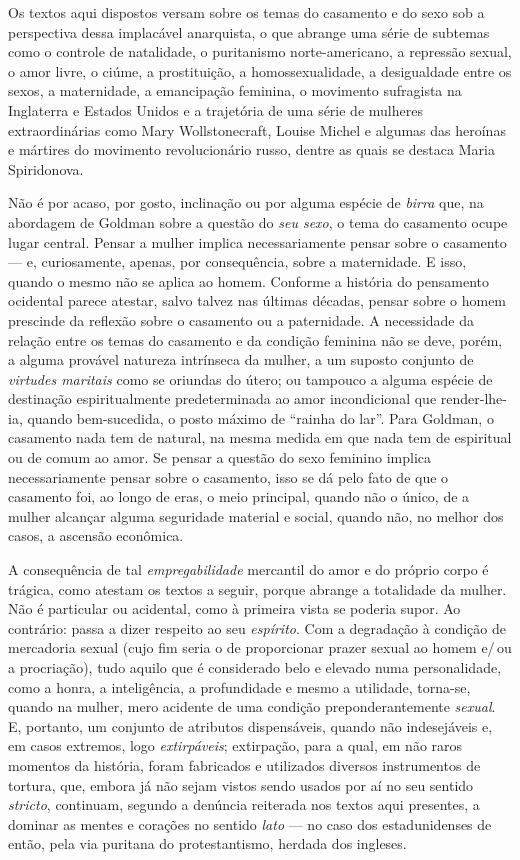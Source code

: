 Os textos aqui dispostos versam sobre os temas do casamento e do sexo
sob a perspectiva dessa implacável anarquista, o que abrange uma série
de subtemas como o controle de natalidade, o puritanismo
norte-americano, a repressão sexual, o amor livre, o ciúme, a
prostituição, a homossexualidade, a desigualdade entre os sexos, a
maternidade, a emancipação feminina, o movimento sufragista na
Inglaterra e Estados Unidos e a trajetória de uma série de mulheres
extraordinárias como Mary Wollstonecraft, Louise Michel e algumas das
heroínas e mártires do movimento revolucionário russo, dentre as quais
se destaca Maria Spiridonova.

Não é por acaso, por gosto, inclinação ou por alguma espécie de
\textit{birra} que, na abordagem de Goldman sobre a questão do \textit{seu sexo},
o tema do casamento ocupe lugar central. Pensar a mulher implica
necessariamente pensar sobre o casamento --- e, curiosamente, apenas, por
consequência, sobre a maternidade. E isso, quando o mesmo não se aplica
ao homem. Conforme a história do pensamento ocidental parece atestar,
salvo talvez nas últimas décadas, pensar sobre o homem prescinde da
reflexão sobre o casamento ou a paternidade. A necessidade da
relação entre os temas do casamento e da condição feminina não se deve,
porém, a alguma provável natureza intrínseca da mulher, a um suposto
conjunto de \textit{virtudes maritais} como se oriundas do útero; ou tampouco
a alguma espécie de destinação espiritualmente predeterminada ao amor
incondicional que render-lhe-ia, quando bem-sucedida, o posto máximo de
``rainha do lar''. Para Goldman, o casamento nada tem de natural, na
mesma medida em que nada tem de espiritual ou de comum ao amor. Se
pensar a questão do sexo feminino implica necessariamente pensar sobre o
casamento, isso se dá pelo fato de que o casamento foi, ao longo de
eras, o meio principal, quando não o único, de a mulher alcançar alguma
seguridade material e social, quando não, no melhor dos casos, a
ascensão econômica.

A consequência de tal \textit{empregabilidade} mercantil do amor e do próprio
corpo é trágica, como atestam os textos a seguir, porque abrange
a totalidade da mulher. Não é particular ou acidental, como à primeira
vista se poderia supor. Ao contrário: passa a dizer respeito ao seu
\textit{espírito}. Com a degradação à condição de mercadoria sexual (cujo
fim seria o de proporcionar prazer sexual ao homem e/\,ou a procriação),
tudo aquilo que é considerado belo e elevado numa personalidade, como a
honra, a inteligência, a profundidade e mesmo a utilidade, torna-se,
quando na mulher, mero acidente de uma condição
preponderantemente \textit{sexual}. E, portanto, um conjunto de atributos
dispensáveis, quando não indesejáveis e, em casos extremos, logo
\textit{extirpáveis}; extirpação, para a qual, em não raros momentos da
história, foram fabricados e utilizados diversos instrumentos de
tortura, que, embora já não sejam vistos sendo usados por aí no seu
sentido \textit{stricto}, continuam, segundo a denúncia reiterada nos
textos aqui presentes, a dominar as mentes e corações no sentido
\textit{lato} --- no caso dos estadunidenses de então, pela via puritana do
protestantismo, herdada dos ingleses. 

